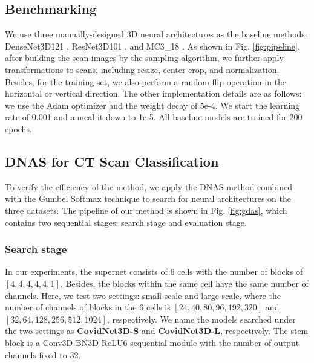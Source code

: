 \documentclass[letterpaper]{article}
\begin{document}
\subsection{Benchmarking}

We use three manually-designed 3D neural architectures as the baseline methods: DenseNet3D121 \cite{densenet3d}, ResNet3D101 \cite{videoresnet}, and MC3\_18 \cite{videoresnet}. As shown in Fig. \ref{fig:pipeline}, after building the scan images by the sampling algorithm, we further apply transformations to scans, including resize, center-crop, and normalization. Besides, for the training set, we also perform a random flip operation in the horizontal or vertical direction. The other implementation details are as follows: we use the Adam \cite{adam} optimizer and the weight decay of 5e-4. We start the learning rate of 0.001 and anneal it down to 1e-5. All baseline models are trained for 200 epochs.









\subsection{DNAS for CT Scan Classification}

To verify the efficiency of the method, we apply the DNAS method combined with the Gumbel Softmax technique to search for neural architectures on the three datasets. The pipeline of our method is shown in Fig. \ref{fig:gdas}, which contains two sequential stages: search stage and evaluation stage.

\subsubsection{Search stage}

In our experiments, the supernet consists of 6 cells with the number of blocks of $[4,4,4,4,4,1]$. Besides, the blocks within the same cell have the same number of channels. Here, we test two settings: small-scale and large-scale, where the number of channels of blocks in the 6 cells is $[24, 40, 80, 96, 192, 320]$ and $[32, 64, 128, 256, 512, 1024]$, respectively. We name the models searched under the two settings as \textbf{CovidNet3D-S} and \textbf{CovidNet3D-L}, respectively. The stem block is a Conv3D-BN3D-ReLU6 sequential module with the number of output channels fixed to 32.
\end{document}
